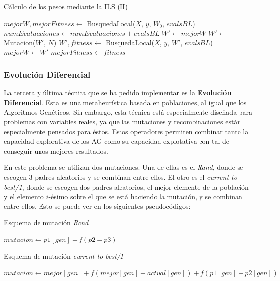 \documentclass[11pt,a4paper]{article}
\begin{document}
\begin{algorithm}[H]
\caption{Cálculo de los pesos mediante la ILS (II)}
\begin{algorithmic}
\State $mejorW, mejorFitness \gets$ BusquedaLocal($X$, $y$, $W_0$, $evalsBL$)
\State $numEvaluaciones \gets numEvaluaciones + evalsBL$
	\State $W' \gets mejorW$
	\State $W' \gets $ Mutacion($W'$, $N$)
	\State $W', fitness \gets$ BusquedaLocal($X$, $y$, $W'$, $evalsBL$)
		\State $mejorW \gets W'$
		\State $mejorFitness \gets fitness$
	\EndIf
\EndWhile
\State {}
\EndFunction
\end{algorithmic}
\end{algorithm}

\newpage

\subsubsection{Evolución Diferencial}

La tercera y última técnica que se ha pedido implementar es la \textbf{Evolución Diferencial}. Esta es una metaheurística basada
en poblaciones, al igual que los Algoritmos Genéticos. Sin embargo, esta técnica está especialmente diseñada para problemas
con variables reales, ya que las mutaciones y recombinaciones están especialmente pensados para éstos. Estos operadores permiten
combinar tanto la capacidad explorativa de los AG como su capacidad explotativa con tal de conseguir unos mejores resultados.

En este problema se utilizan dos mutaciones. Una de ellas es el \textit{Rand}, donde se escogen 3 padres aleatorios y se
combinan entre ellos. El otro es el \textit{current-to-best/1}, donde se escogen dos padres aleatorios, el mejor elemento
de la población y el elemento $i$-ésimo sobre el que se está haciendo la mutación, y se combinan entre ellos. Esto se puede ver
en los siguientes pseudocódigos:

\begin{algorithm}[H]
\caption{Esquema de mutación \textit{Rand}}
\begin{algorithmic}[1]
\State $mutacion \gets p1[gen] + f (p2 - p3)$
\State {}
\EndFunction
\end{algorithmic}
\end{algorithm}

\begin{algorithm}[H]
\caption{Esquema de mutación \textit{current-to-best/1}}
\begin{algorithmic}[1]
\State $mutacion \gets mejor[gen] + f (mejor[gen] - actual[gen]) + f (p1[gen] - p2[gen])$
\State {}
\EndFunction
\end{algorithmic}
\end{algorithm}
\end{document}
